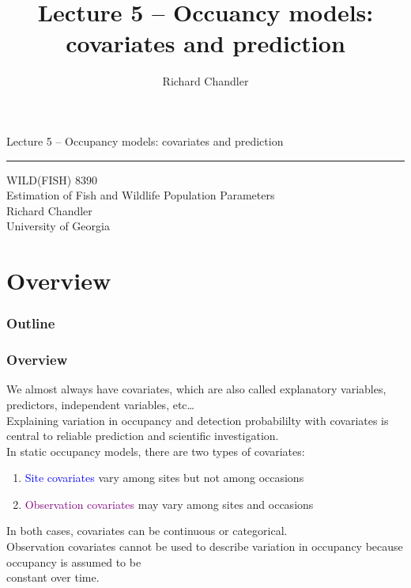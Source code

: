 \documentclass[color=usenames,dvipsnames]{beamer}\usepackage[]{graphicx}\usepackage[]{color}
\title{Lecture 5 -- Occuancy models: covariates and prediction }
\author{Richard Chandler}
\begin{document}
\begin{frame}[plain]
  \LARGE
  \centering
  {\huge Lecture 5 -- Occupancy models: covariates and prediction} \\
  {\color{default} \rule{\textwidth}{0.1pt}}
  \vfill
  \large
  WILD(FISH) 8390 \\
  Estimation of Fish and Wildlife Population Parameters \\
  \vfill
  \large
  Richard Chandler \\
  University of Georgia \\
\end{frame}






\section{Overview}



\begin{frame}[plain]
  \frametitle{Outline}
  \Large
\end{frame}



\begin{frame}
  \frametitle{Overview}
  We almost always have covariates, which are also called explanatory
  variables, predictors, independent variables, etc\dots \\
  \pause
  \vfill
  Explaining variation in occupancy and detection probabililty with
  covariates is central to reliable prediction and scientific
  investigation. \\  
  \pause
  \vfill
  In static occupancy models, there are two types of covariates:
  \begin{enumerate}
    \item \textcolor{blue}{Site covariates} vary among sites
      but not among occasions
    \item \textcolor{Purple}{Observation covariates} may vary among
      sites and occasions
  \end{enumerate}
  \pause
  \vfill
  In both cases, covariates can be continuous or categorical. \\
  \pause
  \vfill
  \centering
  \alert{Observation covariates cannot be used to describe variation
    in occupancy because occupancy is assumed to be \\ constant over
    time.} \\ 
\end{frame}
\end{document}
